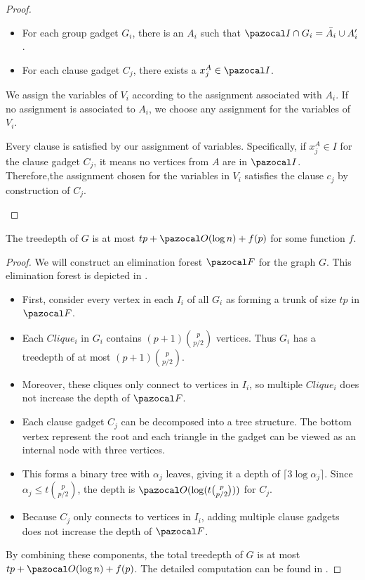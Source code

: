 \begin{proof}
\begin{itemize}
        \begin{itemize}
            \item For each group gadget $G_i$, there is an $A_i$ such that $\I \cap G_i = \bar{A_i} \cup A_i'$.
            \item For each clause gadget $C_j$, there exists a $x_j^A \in \I$.
        \end{itemize}

        We assign the variables of $V_i$ according to the assignment associated with $A_i$. If no assignment is associated to $A_i$, we choose any assignment for the variables of $V_i$.
        
        Every clause is satisfied by our assignment of variables. Specifically, if $x_j^A \in I$ for the clause gadget $C_j$, it means no vertices from $A$ are in $\I$. Therefore,the assignment chosen for the variables in $V_i$ satisfies the clause $c_j$ by construction of $C_j$.
    \end{itemize}
\end{proof}

\begin{lemma}
    \label{lemma:indset-sat-graph-td}
    The treedepth of $G$ is at most $tp + \O(\log n) + f(p)$ for some function $f$.
\end{lemma}

\begin{proof}
    We will construct an elimination forest $\F$ for the graph $G$. This elimination forest is depicted in .
    
    \begin{itemize}
        \item First, consider every vertex in each $I_i$ of all $G_i$ as forming a trunk of size $tp$ in $\F$.
        \item  Each $Clique_i$ in $G_i$ contains $(p+1)\binom{p}{p/2}$ vertices. Thus $G_i$ has a treedepth of at most $(p+1)\binom{p}{p/2}$.
        \item Moreover, these cliques only connect to vertices in $I_i$, so multiple $Clique_i$ does not increase the depth of $\F$.
        \item Each clause gadget $C_j$ can be decomposed into a tree structure. The bottom vertex represent the root and each triangle in the gadget can be viewed as an internal node with three vertices.
        \item This forms a binary tree with $\alpha_j$ leaves, giving it a depth of $\lceil3\log{\alpha_j}\rceil$. Since $\alpha_j \leq t\binom{p}{p/2}$, the depth is $\O(\log(t\binom{p}{p/2}))$ for $C_j$.
        \item Because $C_j$ only connects to vertices in $I_i$, adding multiple clause gadgets does not increase the depth of $\F$.
    \end{itemize}

    \medskip

    By combining these components, the total treedepth of $G$ is at most $tp + \O(\log n) + f(p)$. The detailed computation can be found in .
\end{proof}


